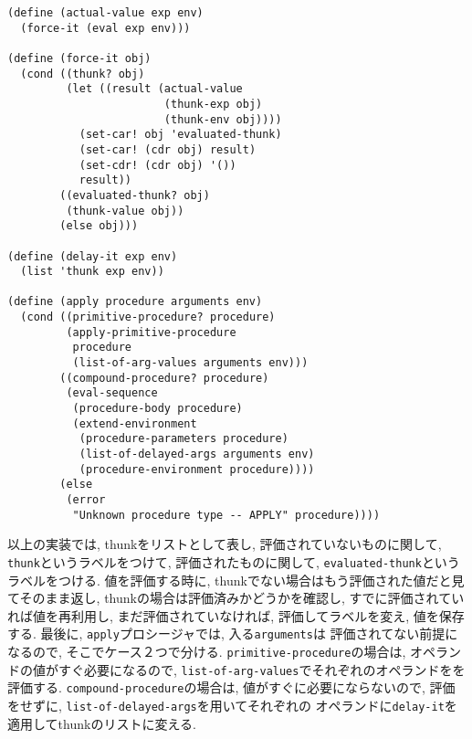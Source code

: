 \begin{lstlisting}[basicstyle=\footnotesize]
(define (actual-value exp env)
  (force-it (eval exp env)))

(define (force-it obj)
  (cond ((thunk? obj)
         (let ((result (actual-value
                        (thunk-exp obj)
                        (thunk-env obj))))
           (set-car! obj 'evaluated-thunk)
           (set-car! (cdr obj) result)
           (set-cdr! (cdr obj) '())
           result))
        ((evaluated-thunk? obj)
         (thunk-value obj))
        (else obj)))

(define (delay-it exp env)
  (list 'thunk exp env))

(define (apply procedure arguments env)
  (cond ((primitive-procedure? procedure)
         (apply-primitive-procedure
          procedure
          (list-of-arg-values arguments env)))
        ((compound-procedure? procedure)
         (eval-sequence
          (procedure-body procedure)
          (extend-environment
           (procedure-parameters procedure)
           (list-of-delayed-args arguments env)
           (procedure-environment procedure))))
        (else
         (error
          "Unknown procedure type -- APPLY" procedure))))
\end{lstlisting}

以上の実装では, thunkをリストとして表し, 評価されていないものに関して,
\lstinline{thunk}というラベルをつけて, 評価されたものに関して,
\lstinline{evaluated-thunk}というラベルをつける.
値を評価する時に, thunkでない場合はもう評価された値だと見てそのまま返し,
thunkの場合は評価済みかどうかを確認し, すでに評価されていれば値を再利用し,
まだ評価されていなければ, 評価してラベルを変え, 値を保存する.
最後に, \lstinline{apply}プロシージャでは, 入る\lstinline{arguments}は
評価されてない前提になるので, そこでケース２つで分ける.
\lstinline{primitive-procedure}の場合は, オペランドの値がすぐ必要になるので,
\lstinline{list-of-arg-values}でそれぞれのオペランドをを評価する.
\lstinline{compound-procedure}の場合は, 値がすぐに必要にならないので,
評価をせずに, \lstinline{list-of-delayed-args}を用いてそれぞれの
オペランドに\lstinline{delay-it}を適用してthunkのリストに変える.